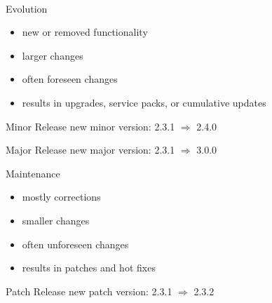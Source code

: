\begin{frame}{\insertsubsection\ \mytitlesource{\ludewiglichter}}
	\begin{mycolumns}[t]
		\begin{note}{Evolution}
			\begin{itemize}
				\item new or removed functionality
				\item larger changes
				\item often foreseen changes
				\item results in upgrades, service packs, or cumulative updates
			\end{itemize}
		\end{note}
		\begin{example}{Minor Release}
			new minor version: 2.3.1 $\Rightarrow$ 2.4.0
		\end{example}
		\begin{example}{Major Release}
			new major version: 2.3.1 $\Rightarrow$ 3.0.0
		\end{example}
	\mynextcolumn
		\begin{note}{Maintenance}
			\begin{itemize}
				\item mostly corrections
				\item smaller changes
				\item often unforeseen changes
				\item results in patches and hot fixes
			\end{itemize}
		\end{note}
		\begin{example}{Patch Release}
			new patch version: 2.3.1 $\Rightarrow$ 2.3.2
		\end{example}
	\end{mycolumns}
\end{frame}



